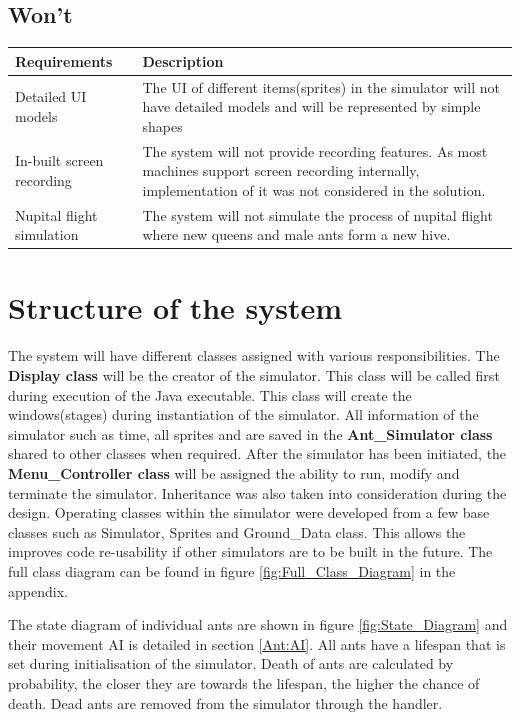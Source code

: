 \documentclass[a4paper, oneside, 11pt]{report}
\begin{document}
\subsection{Won't}
\begin{tabular}{|| p{3.5cm} | p{10.5cm} ||} 
	\hline
	Requirements & Description \\
	\hline
	Detailed UI models &  The UI of different items(sprites) in the simulator will not have detailed models and will be represented by simple shapes\\
	\hline
	In-built screen recording & The system will not provide recording features. As most machines support screen recording internally, implementation of it was not considered in the solution. \\
	\hline
	Nupital flight simulation & The system will not simulate the process of nupital flight where new queens and male ants form a new hive.\\
	\hline
\end{tabular}

\section{Structure of the system}
The system will have different classes assigned with various responsibilities. The \textbf{Display class} will be the creator of the simulator. This class will be called first during execution of the Java executable. This class will create the windows(stages) during instantiation of the simulator. All information of the simulator such as time, all sprites and are saved in the \textbf{Ant\_Simulator class} shared to other classes when required. After the simulator has been initiated, the \textbf{Menu\_Controller class} will be assigned the ability to run, modify and terminate the simulator. Inheritance was also taken into consideration during the design. Operating classes within the simulator were developed from a few base classes such as Simulator, Sprites and Ground\_Data class. This allows the improves code re-usability if other simulators are to be built in the future. The full class diagram can be found in figure \ref{fig:Full_Class_Diagram} in the appendix.

The state diagram of individual ants are shown in figure \ref{fig:State_Diagram} and their movement AI is detailed in section \ref{Ant:AI}. All ants have a lifespan that is set during initialisation of the simulator. Death of ants are calculated by probability, the closer they are towards the lifespan, the higher the chance of death. Dead ants are removed from the simulator through the handler.
\end{document}
